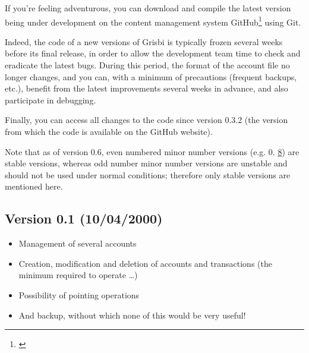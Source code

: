 If you're feeling adventurous, you can download and compile the latest version being under development on the content management system \gls{GitHub}\footnote{\urlGitHubGrisbi{}\label{siteGitHubGrisbi}} using \gls{Git}.

Indeed, the code of a new versions of Grisbi is typically frozen several weeks before its final release, in order to allow the development team time to check and eradicate the latest bugs. During this period, the format of the account file no longer changes, and you can, with a minimum of precautions (frequent backups, etc.), benefit from the latest improvements several weeks in advance, and also participate in debugging.

Finally, you can access all changes to the code since version 0.3.2 (the version from which the code is available on the \gls{GitHub} website).

Note that as of version 0.6, even numbered minor number versions (e.g. 0. \underline8) are stable versions, whereas odd number minor number versions are unstable and should not be used under normal conditions; therefore only stable versions are mentioned here.


\subsection{Version 0.1 \textnormal{(10/04/2000)}}

\begin{itemize}
	\item Management of several accounts%
	\item Creation, modification and deletion of accounts and transactions (the minimum required to operate  \dots{})%
	\item Possibility of pointing operations%
	\item And backup, without which none of this would be very useful!%
\end{itemize}

